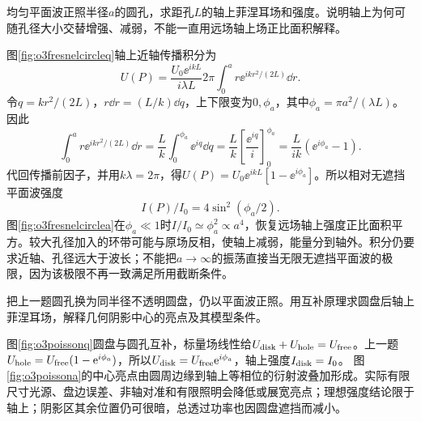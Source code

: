 \begin{exercise}\label{ex:o3fresnelcircle}
均匀平面波正照半径$a$的圆孔，求距孔$L$的轴上菲涅耳场和强度。说明轴上为何可随孔径大小交替增强、减弱，不能一直用远场轴上场正比面积解释。
\end{exercise}
\begin{solution}
图\ref{fig:o3fresnelcircleq}轴上近轴传播积分为
\[
 U(P)=\frac{U_0\ee^{ikL}}{i\lambda L}
 2\pi\int_0^a r\ee^{ikr^2/(2L)}\dd r.
\]
令$q=kr^2/(2L)$，$r\dd r=(L/k)\dd q$，上下限变为$0,\phi_a$，其中$\phi_a=\pi a^2/(\lambda L)$。因此
\[
 \int_0^a r\ee^{ikr^2/(2L)}\dd r
 =\frac Lk\int_0^{\phi_a}\ee^{iq}\dd q
 =\frac Lk\left[\frac{\ee^{iq}}i\right]_0^{\phi_a}
 =\frac{L}{ik}(\ee^{i\phi_a}-1).
\]
代回传播前因子，并用$k\lambda=2\pi$，得$U(P)=U_0\ee^{ikL}[1-\ee^{i\phi_a}]$。所以相对无遮挡平面波强度
\[
 I(P)/I_0=4\sin^2(\phi_a/2).
\]
图\ref{fig:o3fresnelcirclea}在$\phi_a\ll1$时$I/I_0\simeq\phi_a^2\propto a^4$，恢复远场轴上强度正比面积平方。较大孔径加入的环带可能与原场反相，使轴上减弱，能量分到轴外。积分仍要求近轴、孔径远大于波长；不能把$a\to\infty$的振荡直接当无限无遮挡平面波的极限，因为该极限不再一致满足所用截断条件。
\end{solution}

\begin{exercise}\label{ex:o3poisson}
把上一题圆孔换为同半径不透明圆盘，仍以平面波正照。用互补原理求圆盘后轴上菲涅耳场，解释几何阴影中心的亮点及其模型条件。
\end{exercise}
\begin{solution}
图\ref{fig:o3poissonq}圆盘与圆孔互补，标量场线性给$U_{\rm disk}+U_{\rm hole}=U_{\rm free}$。上一题$U_{\rm hole}=U_{\rm free}(1-\mathrm e^{i\phi_a})$，所以$U_{\rm disk}=U_{\rm free}\mathrm e^{i\phi_a}$，轴上强度$I_{\rm disk}=I_0$。
图\ref{fig:o3poissona}的中心亮点由圆周边缘到轴上等相位的衍射波叠加形成。实际有限尺寸光源、盘边误差、非轴对准和有限照明会降低或展宽亮点；理想强度结论限于轴上；阴影区其余位置仍可很暗，总透过功率也因圆盘遮挡而减小。
\end{solution}
